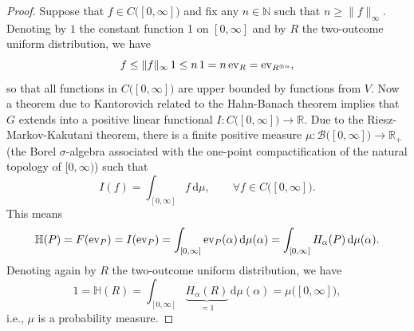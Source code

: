 \documentclass[aps,pra,11pt,onecolumn,nofootinbib,tightenlines]{revtex4-2}
\theoremstyle{definition}
\newcommand{\R}{\mathbb{R}}
\newcommand{\mc}[1]{\mathcal{#1}}
\newcommand{\mb}[1]{\mathbb{#1}}
\begin{document}
\begin{proof}
    Suppose that $f\in C\big([0,\infty]\big)$ and fix any $n\in\mb N$ such that $n\geq\|f\|_\infty$. Denoting by $1$ the constant function 1 on $[0,\infty]$ and by $R$ the two-outcome uniform distribution, we have
    \begin{equation}
    f\leq \|f\|_\infty\,1\leq n\,1=n\,{\rm ev}_R={\rm ev}_{R^{\otimes n}},
    \end{equation}
    so that all functions in $C\big([0,\infty]\big)$ are upper bounded by functions from $V$. Now a theorem due to Kantorovich \cite{Kantorovich} related to the Hahn-Banach theorem implies that $G$ extends into a positive linear functional $I:C\big([0,\infty]\big)\to\R$. Due to the Riesz-Markov-Kakutani theorem, there is a finite positive measure $\mu:\mc B\big([0,\infty]\big)\to\R_+$ (the Borel $\sigma$-algebra associated with the one-point compactification of the natural topology of $[0,\infty)$) such that
    \begin{equation}
    I(f)=\int_{[0,\infty]}f\,\mathrm{d}\mu,\qquad\forall f\in C\big([0,\infty]\big).
    \end{equation}
    This means
    \begin{equation}
    \mb H(P)=F({\rm ev}_P)=I({\rm ev}_P)=\int_{[0,\infty]}{\rm ev}_P(\alpha)\,\mathrm{d}\mu(\alpha)=\int_{[0,\infty]}H_\alpha(P)\,\mathrm{d}\mu(\alpha).
    \end{equation}
    Denoting again by $R$ the two-outcome uniform distribution, we have
    \begin{equation}
    1=\mb H(R)=\int_{[0,\infty]}\underbrace{H_\alpha(R)}_{=1}\,\mathrm{d}\mu(\alpha)=\mu\big([0,\infty]\big),
    \end{equation}
    i.e., $\mu$ is a probability measure.
\end{proof}
\end{document}

